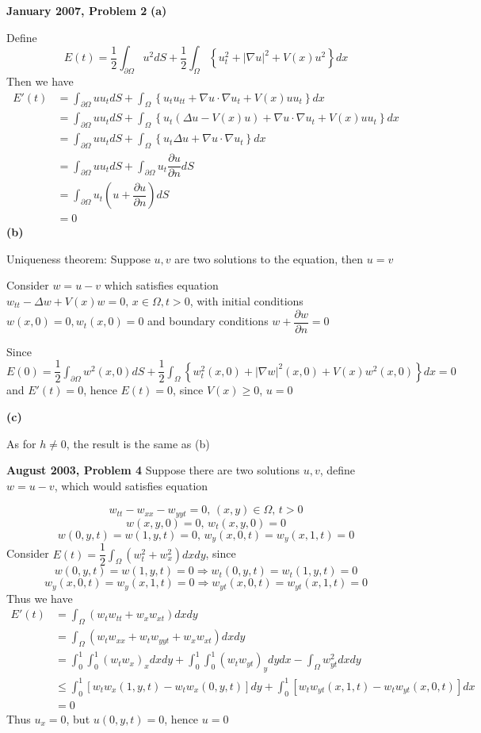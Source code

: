\documentclass[../main.tex]{subfiles}
\begin{document}
\begin{customproblem}\textbf{January 2007, Problem 2}
\textbf{(a)} \par
Define 
\[
E(t)=\dfrac{1}{2}\int_{\partial\Omega}u^2dS+\dfrac{1}{2}\int_{\Omega}\left\{u_t^2+|\nabla u|^2+V(x)u^2\right\}dx
\]
Then we have
\[
\begin{aligned}
E'(t)
&=\int_{\partial\Omega}uu_tdS+\int_{\Omega}\left\{u_tu_{tt}+\nabla u\cdot\nabla u_t+V(x)uu_t\right\}dx \\
&=\int_{\partial\Omega}uu_tdS+\int_{\Omega}\left\{u_t\left(\Delta u-V(x)u\right)+\nabla u\cdot\nabla u_t+V(x)uu_t\right\}dx \\
&=\int_{\partial\Omega}uu_tdS+\int_{\Omega}\left\{u_t\Delta u+\nabla u\cdot\nabla u_t\right\}dx \\
&=\int_{\partial\Omega}uu_tdS+\int_{\partial\Omega}u_t\dfrac{\partial u}{\partial n}dS \\
&=\int_{\partial\Omega}u_t\left(u+\dfrac{\partial u}{\partial n}\right)dS \\
&=0
\end{aligned}
\]
\textbf{(b)} \par
Uniqueness theorem: Suppose $u,v$ are two solutions to the equation, then $u=v$ \par
Consider $w=u-v$ which satisfies equation $w_{tt}-\Delta w+V(x)w=0,\,x\in\Omega,t>0$, with initial conditions $w(x,0)=0, w_t(x,0)=0$ and boundary conditions $w+\dfrac{\partial w}{\partial n}=0$ \par
Since $\displaystyle E(0)=\dfrac{1}{2}\int_{\partial\Omega}w^2(x,0)dS+\dfrac{1}{2}\int_{\Omega}\left\{w_t^2(x,0)+|\nabla w|^2(x,0)+V(x)w^2(x,0)\right\}dx=0$ and $E'(t)=0$, hence $E(t)=0$, since $V(x)\geq 0$, $u=0$ \par
\textbf{(c)} \par
As for $h\neq 0$, the result is the same as (b)
\end{customproblem}

\begin{customproblem}\textbf{August 2003, Problem 4}
Suppose there are two solutions $u,v$, define $w=u-v$, which would satisfies equation \par
\[w_{tt}-w_{xx}-w_{yyt}=0,\,(x,y)\in\Omega,\,t>0\]\[w(x,y,0)=0,\,w_{t}(x,y,0)=0\]\[w(0,y,t)=w(1,y,t)=0,\,w_y(x,0,t)=w_y(x,1,t)=0\]
Consider $\displaystyle E(t)=\dfrac{1}{2}\int_{\Omega}(w_t^2+w_x^2)dxdy$, since
\[w(0,y,t)=w(1,y,t)=0 \Rightarrow w_t(0,y,t)=w_t(1,y,t)=0\]\[w_y(x,0,t)=w_y(x,1,t)=0 \Rightarrow w_{yt}(x,0,t)=w_{yt}(x,1,t)=0\]
Thus we have
\[
\begin{aligned}
E'(t)
&=\int_{\Omega}(w_tw_{tt}+w_xw_{xt})dxdy \\
&=\int_{\Omega}(w_tw_{xx}+w_tw_{yyt}+w_xw_{xt})dxdy \\
&=\int_0^1\int_0^1(w_tw_x)_xdxdy+\int_0^1\int_0^1(w_tw_{yt})_ydydx-\int_{\Omega}w_{yt}^2dxdy \\
&\leq \int_0^1[w_tw_x(1,y,t)-w_tw_x(0,y,t)]dy+\int_0^1[w_tw_{yt}(x,1,t)-w_tw_{yt}(x,0,t)]dx \\
&=0
\end{aligned}
\]
Thus $u_x=0$, but $u(0,y,t)=0$, hence $u=0$
\end{customproblem}
\end{document}
